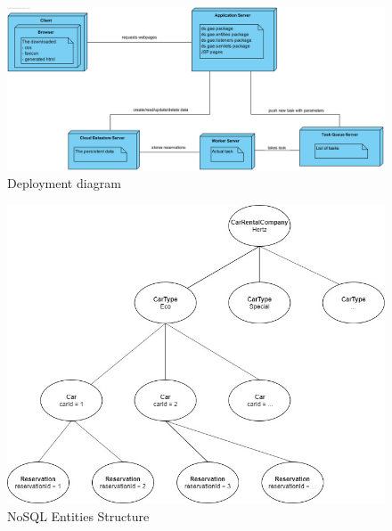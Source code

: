 \documentclass{ds-report}
\begin{document}
	
	
	
	
	
		\clearpage

\begin{figure}
  \includegraphics[width=\linewidth]{GAE_opdracht_2_deployment.png}
  \caption{Deployment diagram}
  \label{fig:deployment_diagram}
\end{figure}	

\begin{figure}
  \includegraphics[width=\linewidth]{GAE_opdracht_2_structure.jpg}
  \caption{NoSQL Entities Structure}
  \label{fig:structure}
\end{figure}

	
	\clearpage


	
\end{document}

